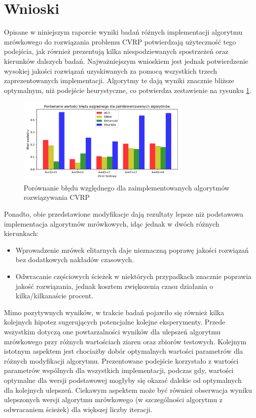 \documentclass[10pt]{article}
\begin{document}
\section{Wnioski}
Opisane w niniejszym raporcie wyniki badań różnych implementacji algorytmu mrówkowego do rozwiązania problemu CVRP potwierdzają użyteczność tego podejścia, jak również prezentują kilka niespodziewanych spostrzeżeń oraz kierunków dalszych badań. Najważniejszym wnioskiem jest jednak potwierdzenie wysokiej jakości rozwiązań uzyskiwanych za pomocą wszystkich trzech zaprezentowanych implementacji. Algorytmy te dają wyniki znacznie bliższe optymalnym, niż podejście heurystyczne, co potwierdza zestawienie na rysunku \ref{fig:errors_comparison}. 

\begin{figure}[H]
    \centering
    \includegraphics[width=0.75\textwidth]{errors_comparison.png}
    \caption{Porównanie błędu względnego dla zaimplementowanych algorytmów rozwiązywania CVRP}
    \label{fig:errors_comparison}
\end{figure}

Ponadto, obie przedstawione modyfikacje dają rezultaty lepsze niż podstawowa implementacja algorytmów mrówkowych, idąc jednak w dwóch różnych kierunkach:
\begin{itemize}
    \item Wprowadzenie mrówek elitarnych daje nieznaczną poprawę jakości rozwiązań bez dodatkowych nakładów czasowych.
    \item Odwracanie częściowych ścieżek w niektórych przypadkach znacznie poprawia jakość rozwiązania, jednak kosztem zwiększenia czasu działania o kilka/kilkanaście procent.
\end{itemize}

Mimo pozytywnych wyników, w trakcie badań pojawiło się również kilka kolejnych hipotez sugerujących potencjalne kolejne eksperymenty. Przede wszystkim dotyczą one powtarzalności wyników dla ulepszeń algorytmu mrówkowego przy różnych wartościach ziaren oraz zbiorów testowych. Kolejnym istotnym aspektem jest chociażby dobór optymalnych wartości parametrów dla różnych modyfikacji algorytmu. Prezentowane podejście korzystało z wartości parametrów wspólnych dla wszystkich implementacji, podczas gdy, wartości optymalne dla wersji podstawowej mogłyby się okazać dalekie od optymalnych dla kolejnych ulepszeń. Ciekawym aspektem może być również obserwacja wyniku ulepszonych wersji algorytmu mrówkowego (w szczególności algorytmu z odwracaniem ścieżek) dla większej liczby iteracji.

\printbibliography
\end{document}
